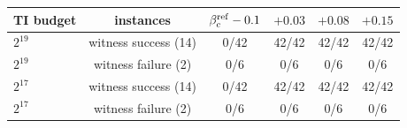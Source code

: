 \begin{tabular}{lccccc}
\toprule
TI budget & instances & $\beta_c^{\rm ref}-0.1$ & $+0.03$ & $+0.08$ & $+0.15$ \\
\midrule
$2^{19}$ & witness success (14) & 0/42 & 42/42 & 42/42 & 42/42 \\
$2^{19}$ & witness failure (2) & 0/6 & 0/6 & 0/6 & 0/6 \\
$2^{17}$ & witness success (14) & 0/42 & 42/42 & 42/42 & 42/42 \\
$2^{17}$ & witness failure (2) & 0/6 & 0/6 & 0/6 & 0/6 \\
\bottomrule
\end{tabular}

